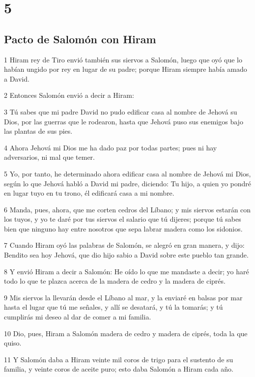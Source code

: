 \chapter{5}

\section*{Pacto de Salomón con Hiram}

\par 1 Hiram rey de Tiro envió también sus siervos a Salomón, luego que oyó que lo habían ungido por rey en lugar de su padre; porque Hiram siempre había amado a David.
\par 2 Entonces Salomón envió a decir a Hiram:
\par 3 Tú sabes que mi padre David no pudo edificar casa al nombre de Jehová su Dios, por las guerras que le rodearon, hasta que Jehová puso sus enemigos bajo las plantas de sus pies.
\par 4 Ahora Jehová mi Dios me ha dado paz por todas partes; pues ni hay adversarios, ni mal que temer.
\par 5 Yo, por tanto, he determinado ahora edificar casa al nombre de Jehová mi Dios, según lo que Jehová habló a David mi padre, diciendo: Tu hijo, a quien yo pondré en lugar tuyo en tu trono, él edificará casa a mi nombre. 
\par 6 Manda, pues, ahora, que me corten cedros del Líbano; y mis siervos estarán con los tuyos, y yo te daré por tus siervos el salario que tú dijeres; porque tú sabes bien que ninguno hay entre nosotros que sepa labrar madera como los sidonios.
\par 7 Cuando Hiram oyó las palabras de Salomón, se alegró en gran manera, y dijo: Bendito sea hoy Jehová, que dio hijo sabio a David sobre este pueblo tan grande.
\par 8 Y envió Hiram a decir a Salomón: He oído lo que me mandaste a decir; yo haré todo lo que te plazca acerca de la madera de cedro y la madera de ciprés.
\par 9 Mis siervos la llevarán desde el Líbano al mar, y la enviaré en balsas por mar hasta el lugar que tú me señales, y allí se desatará, y tú la tomarás; y tú cumplirás mi deseo al dar de comer a mi familia.
\par 10 Dio, pues, Hiram a Salomón madera de cedro y madera de ciprés, toda la que quiso.
\par 11 Y Salomón daba a Hiram veinte mil coros   de trigo para el sustento de su familia, y veinte coros de aceite puro; esto daba Salomón a Hiram cada año.

